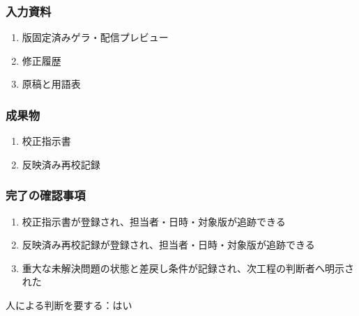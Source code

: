\documentclass[a4paper,11pt]{article}
\begin{document}
\subsubsection*{入力資料}
\begin{enumerate}[leftmargin=2em,itemsep=0.35em]
\item 版固定済みゲラ・配信プレビュー
\item 修正履歴
\item 原稿と用語表
\end{enumerate}
\subsubsection*{成果物}
\begin{enumerate}[leftmargin=2em,itemsep=0.35em]
\item 校正指示書
\item 反映済み再校記録
\end{enumerate}
\subsubsection*{完了の確認事項}
\begin{enumerate}[leftmargin=2em,itemsep=0.35em]
\item 校正指示書が登録され、担当者・日時・対象版が追跡できる
\item 反映済み再校記録が登録され、担当者・日時・対象版が追跡できる
\item 重大な未解決問題の状態と差戻し条件が記録され、次工程の判断者へ明示された
\end{enumerate}
\par 人による判断を要する：はい\par\medskip
\end{document}
